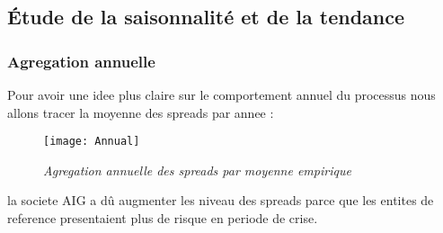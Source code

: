 

    \subsection{Étude de la saisonnalité et de la tendance}



        \subsubsection{Agregation annuelle}
            Pour avoir une idee plus claire sur le comportement annuel du
            processus nous allons tracer la moyenne des spreads par annee :
            \begin{figure}[H]
                \centering 
                \label{fig:annual} 
                \texttt{[image: Annual]} 
                \caption{\it Agregation annuelle des spreads par moyenne empirique } 
            \end{figure} 
             la societe AIG a dû
            augmenter les niveau des spreads parce que les
            entites de reference presentaient plus de risque  en periode de
            crise. 


